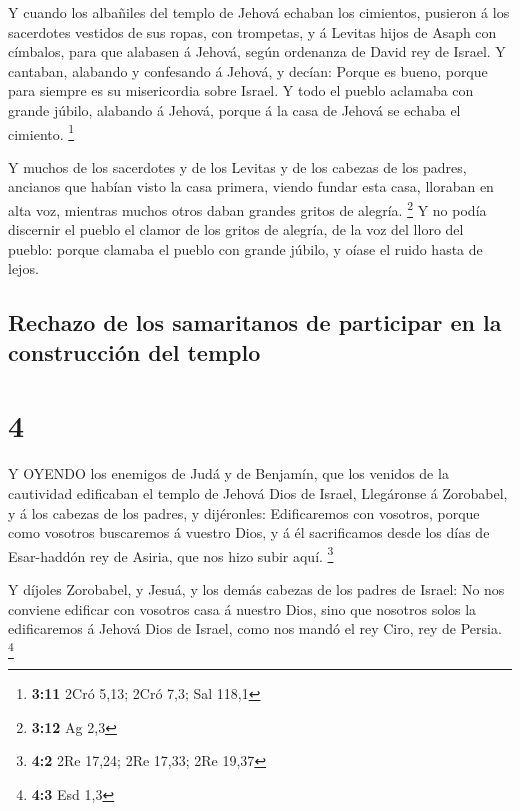  Y cuando los albañiles del templo de Jehová echaban los
cimientos, pusieron á los sacerdotes vestidos de sus ropas, con
trompetas, y á Levitas hijos de Asaph con címbalos, para que alabasen á
Jehová, según ordenanza de David rey de Israel.  Y
cantaban, alabando y confesando á Jehová, y decían: Porque es bueno,
porque para siempre es su misericordia sobre Israel. Y todo el pueblo
aclamaba con grande júbilo, alabando á Jehová, porque á la casa de
Jehová se echaba el cimiento. \footnote{\textbf{3:11} 2Cró 5,13; 2Cró
  7,3; Sal 118,1}

 Y muchos de los sacerdotes y de los Levitas y de los
cabezas de los padres, ancianos que habían visto la casa primera, viendo
fundar esta casa, lloraban en alta voz, mientras muchos otros daban
grandes gritos de alegría. \footnote{\textbf{3:12} Ag 2,3} 
Y no podía discernir el pueblo el clamor de los gritos de alegría, de la
voz del lloro del pueblo: porque clamaba el pueblo con grande júbilo, y
oíase el ruido hasta de lejos.

\hypertarget{rechazo-de-los-samaritanos-de-participar-en-la-construcciuxf3n-del-templo}{%
\subsection{Rechazo de los samaritanos de participar en la construcción
del
templo}\label{rechazo-de-los-samaritanos-de-participar-en-la-construcciuxf3n-del-templo}}

\hypertarget{section-3}{%
\section{4}\label{section-3}}

 Y OYENDO los enemigos de Judá y de Benjamín, que los
venidos de la cautividad edificaban el templo de Jehová Dios de Israel,
 Llegáronse á Zorobabel, y á los cabezas de los padres, y
dijéronles: Edificaremos con vosotros, porque como vosotros buscaremos á
vuestro Dios, y á él sacrificamos desde los días de Esar-haddón rey de
Asiria, que nos hizo subir aquí. \footnote{\textbf{4:2} 2Re 17,24; 2Re
  17,33; 2Re 19,37}

 Y díjoles Zorobabel, y Jesuá, y los demás cabezas de los
padres de Israel: No nos conviene edificar con vosotros casa á nuestro
Dios, sino que nosotros solos la edificaremos á Jehová Dios de Israel,
como nos mandó el rey Ciro, rey de Persia. \footnote{\textbf{4:3} Esd
  1,3}

